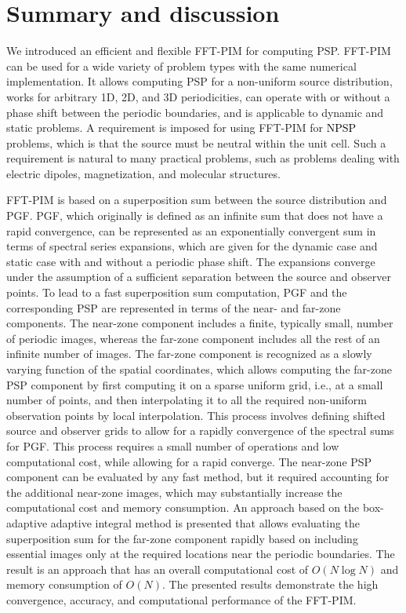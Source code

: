 \documentclass{article}
\begin{document}
\section{Summary and discussion} \label{sec:5}
We introduced an efficient and flexible FFT-PIM for computing PSP. FFT-PIM can be used for a wide variety of problem types with the same numerical implementation. It allows computing PSP for a non-uniform source distribution, works for arbitrary 1D, 2D, and 3D periodicities, can operate with or without a phase shift between the periodic boundaries, and is applicable to dynamic and static problems. A requirement is imposed for using FFT-PIM for \textcolor{black}{NPSP} problems, which is that the source must be neutral within the unit cell. Such a requirement is natural to many practical problems, such as problems dealing with electric dipoles, magnetization, and molecular structures.

FFT-PIM is based on a superposition sum between the source distribution and PGF. PGF, which originally is defined as an infinite sum that does not have a rapid convergence, can be represented as an exponentially convergent sum in terms of spectral series expansions, which are given for the dynamic case and static case with and without a periodic phase shift. The expansions converge under the assumption of a sufficient separation between the source and observer points. To lead to a fast superposition sum computation, PGF and the corresponding PSP are represented in terms of the near- and far-zone components. The near-zone component includes a finite, typically small, number of periodic images, whereas the far-zone component includes all the rest of an infinite number of images. The far-zone component is recognized as a slowly varying function of the spatial coordinates, which allows computing the far-zone PSP component by first computing it on a sparse uniform grid, i.e., at a small number of points, and then interpolating it to all the required non-uniform observation points by local interpolation. This process involves defining shifted source and observer grids to allow for a rapidly convergence of the spectral sums for PGF. This process requires a small number of operations and low computational cost, while allowing for a rapid converge. The near-zone PSP component can be evaluated by any fast method, but it required accounting for the additional near-zone images, which may substantially increase the computational cost and memory consumption. An approach based on the box-adaptive adaptive integral method is presented that allows evaluating the superposition sum for the far-zone component rapidly based on including essential images only at the required locations near the periodic boundaries. The result is an approach that has an overall computational cost of $O(N\log N)$ and memory consumption of $O(N)$. The presented results demonstrate the high convergence, accuracy, and computational performance of the FFT-PIM.
\end{document}
